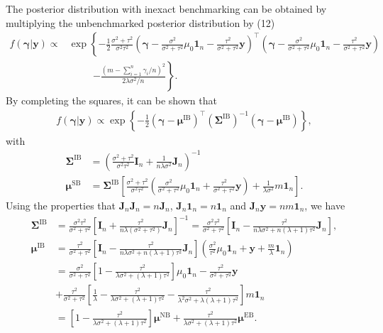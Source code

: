\documentclass[12pt]{article}
\begin{document}
The posterior distribution with inexact benchmarking can be obtained by multiplying the unbenchmarked posterior distribution by (12)
\begin{align*}
f(\bm{\gamma}|\bm{y})\propto&
\exp\left\{-\frac{1}{2}\frac{\sigma^2+\tau^2}{\sigma^2\tau^2}\left(\bm{\gamma}-\frac{\sigma^2}{\sigma^2+\tau^2}\mu_0\bm{1}_n-\frac{\tau^2}{\sigma^2+\tau^2}
\bm{y}\right)^{\top}
\left(\bm{\gamma}-\frac{\sigma^2}{\sigma^2+\tau^2}\mu_0\bm{1}_n-\frac{\tau^2}{\sigma^2+\tau^2}\bm{y}\right)\right.\\
&\quad\quad\ \
\left.-\frac{(m-\sum_{i=1}^n\gamma_i/n)^2}{2\lambda\sigma^2/n}\right\}.
\end{align*}
By completing the squares, it can be shown that
\begin{align*}
f(\bm{\gamma}|\bm{y})\propto
\exp\left\{-\frac{1}{2}(\bm{\gamma}-\bm{\mu}^{\text{IB}})^{\top}(\bm{\Sigma}^{\text{IB}})^{-1}(\bm{\gamma}-\bm{\mu}^{\text{IB}})\right\},
\end{align*}
with
\begin{align*}
\bm{\Sigma}^{\text{IB}}&=\left(\frac{\sigma^2+\tau^2}{\sigma^2\tau^2}\bm{I}_n+\frac{1}{n\lambda\sigma^2}\bm{J}_n\right)^{-1}\\
\bm{\mu}^{\text{SB}}&=\bm{\Sigma}^{\text{IB}}\left[\frac{\sigma^2+\tau^2}{\sigma^2\tau^2}\left(\frac{\sigma^2}{\sigma^2+\tau^2}\mu_0\bm{1}_n+\frac{\tau^2}{\sigma^2+\tau^2}\bm{y}\right)+
\frac{1}{\lambda\sigma^2}m\bm{1}_n\right].
\end{align*}
Using the properties that $\bm{J}_n\bm{J}_n=n\bm{J}_n$, $\bm{J}_n\bm{1}_n=n\bm{1}_n$ and $\bm{J}_n\bm{y}=nm\bm{1}_n$, we have
\begin{align*}
\bm{\Sigma}^{\text{IB}}&=\frac{\sigma^2\tau^2}{\sigma^2+\tau^2}\left[\bm{I}_n+\frac{\tau^2}{n\lambda(\sigma^2+\tau^2)}\bm{J}_n\right]^{-1}
=\frac{\sigma^2\tau^2}{\sigma^2+\tau^2}\left[\bm{I}_n
-
\frac{\tau^2}{n\lambda\sigma^2+n(\lambda+1)\tau^2}\bm{J}_n\right],\\
\bm{\mu}^{\text{IB}}&=\frac{\tau^2}{\sigma^2+\tau^2}\left[\bm{I}_n
-
\frac{\tau^2}{n\lambda\sigma^2+n(\lambda+1)\tau^2}\bm{J}_n\right]\left(\frac{\sigma^2}{\tau^2}\mu_0\bm{1}_n+\bm{y}+\frac{m}{\lambda}\bm{1}_n\right)\\
&=\frac{\sigma^2}{\sigma^2+\tau^2}\left[1-\frac{\tau^2}{\lambda\sigma^2+(\lambda+1)\tau^2}\right]\mu_0\bm{1}_n-\frac{\tau^2}{\sigma^2+\tau^2}\bm{y}\\
&+\frac{\tau^2}{\sigma^2+\tau^2}\left[\frac{1}{\lambda}-\frac{\tau^2}{\lambda\sigma^2+(\lambda+1)\tau^2}-\frac{\tau^2}{\lambda^2\sigma^2+\lambda(\lambda+1)\tau^2}\right]m\bm{1}_n\\
&=\left[1-\frac{\tau^2}{\lambda\sigma^2+(\lambda+1)\tau^2}\right]\bm{\mu}^{\text{NB}}+\frac{\tau^2}{\lambda\sigma^2+(\lambda+1)\tau^2}\bm{\mu}^{\text{EB}}.
\end{align*}
\end{document}
